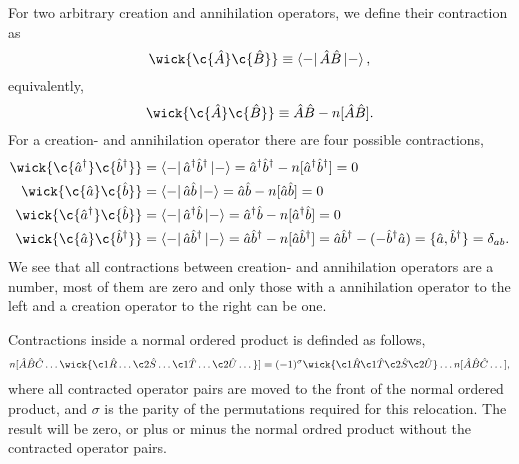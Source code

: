         For two arbitrary creation and annihilation operators, we define their contraction
        as 
        \begin{equation}
            \wick{\c {\hat{A}} \c {\hat{B}} } \equiv \bra{-} \hat{A} \hat{B}\ket{-},
        \end{equation}
        equivalently,
        \begin{equation}
            \wick{\c {\hat{A}} \c {\hat{B}} } \equiv \hat{A}\hat{B} - n[\hat{A} \hat{B}].
        \end{equation}
        For a creation- and annihilation operator there are four possible contractions,
        \begin{equation}
            \begin{aligned}
            \wick{\c{\hat{a}^\dagger} \c{\hat{b}^\dagger}} 
            &= \bra{-}\hat{a}^\dagger \hat{b}^\dagger \ket{-}
            = \hat{a}^\dagger \hat{b}^\dagger - n[\hat{a}^\dagger \hat{b}^\dagger]
            = 0 \\
            \wick{\c{\hat{a}} \c{\hat{b}}} 
            &= \bra{-}\hat{a} \hat{b} \ket{-}
            = \hat{a} \hat{b} - n[\hat{a} \hat{b}]
            = 0 \\
            \wick{\c{\hat{a}^\dagger} \c{\hat{b}}} 
            &= \bra{-}\hat{a}^\dagger \hat{b} \ket{-}
            = \hat{a}^\dagger \hat{b} - n[\hat{a}^\dagger \hat{b}]
            = 0 \\
            \wick{\c{\hat{a}} \c{\hat{b}^\dagger}} 
            &= \bra{-}\hat{a} \hat{b}^\dagger \ket{-}
            = \hat{a} \hat{b}^\dagger - n[\hat{a} \hat{b}^\dagger]
            = \hat{a} \hat{b}^\dagger - (- \hat{b}^\dagger\hat{a})
            = \{\hat{a}, \hat{b}^\dagger \} = \delta_{ab}.
            \end{aligned}
        \end{equation}
        We see that all contractions between creation- and annihilation operators
        are a number, most of them are zero and only those with a annihilation operator
        to the left and a creation operator to the right can be one.
       
		Contractions inside a normal ordered product is definded as follows,
		\begin{equation}
			n[\hat{A}\hat{B}\hat{C} \dots 
			\wick{\c1{\hat{R}} \dots \c2{\hat{S}} \dots 
					\c1{\hat{T}} \dots \c2{\hat{U}} \dots}]
			= (-1)^{\sigma} \wick{\c1{\hat{R}} \c1{\hat{T}} \c2{\hat{S}} \c2{\hat{U}}}
				\dots n[\hat{A}\hat{B}\hat{C}\dots],
		\end{equation}
		where all contracted operator pairs are moved to the front of the normal ordered 
		product, and $\sigma$ is the parity of the permutations required for this relocation.
		The result will be zero, or plus or minus the normal ordred product without the
		contracted operator pairs.

